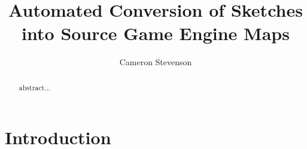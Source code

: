 \documentclass{IEEEtran}
\begin{document}
\title{Automated Conversion of Sketches into Source Game Engine Maps}
\author{Cameron Stevenson}
 
\begin{abstract}
abstract...
\end{abstract}

\maketitle

\section{Introduction}



\end{document}
